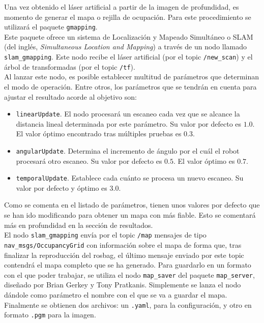 Una vez obtenido el láser artificial a partir de la imagen de profundidad, es momento de generar el mapa o rejilla de ocupación. Para este procedimiento se utilizará el paquete \texttt{gmapping}.\\

Este paquete ofrece un sistema de Localización y Mapeado Simultáneo o SLAM (del inglés, \textit{Simultaneous Location and Mapping}) a través de un nodo llamado \texttt{slam\_gmapping}. Este nodo recibe el láser artificial (por el topic \texttt{/new\_scan}) y el árbol de transformadas (por el topic \texttt{/tf}).\\

Al lanzar este nodo, es posible establecer multitud de parámetros que determinan el modo de operación. Entre otros, los parámetros que se tendrán en cuenta para ajustar el resultado acorde al objetivo son:

\begin{itemize}

	\item \texttt{linearUpdate}. El nodo procesará un escaneo cada vez que se alcance la distancia lineal determinada por este parámetro. Su valor por defecto es $1.0$. El valor óptimo encontrado tras múltiples pruebas es $0.3$.
	\item \texttt{angularUpdate}. Determina el incremento de ángulo por el cuál el robot procesará otro escaneo. Su valor por defecto es $0.5$. El valor óptimo es $0.7$.
	\item \texttt{temporalUpdate}. Establece cada cuánto se procesa un nuevo escaneo. Su valor por defecto y óptimo es $3.0$.

\end{itemize}

Como se comenta en el listado de parámetros, tienen unos valores por defecto que se han ido modificando para obtener un mapa con más fiable. Esto se comentará más en profundidad en la sección de resultados.\\

El nodo \texttt{slam\_gmapping} envía por el topic \texttt{/map} mensajes de tipo \texttt{nav\_msgs\-/OccupancyGrid} con información sobre el mapa de forma que, tras finalizar la reproducción del rosbag, el último mensaje enviado por este topic contendrá el mapa completo que se ha generado. Para guardarlo en un formato con el que poder trabajar, se utiliza el nodo \texttt{map\_saver} del paquete \texttt{map\_server}, diseñado por Brian Gerkey y Tony Pratkanis. Simplemente se lanza el nodo dándole como parámetro el nombre con el que se va a guardar el mapa. Finalmente se obtienen dos archivos: un \texttt{.yaml}, para la configuración, y otro en formato \texttt{.pgm} para la imagen.\\

